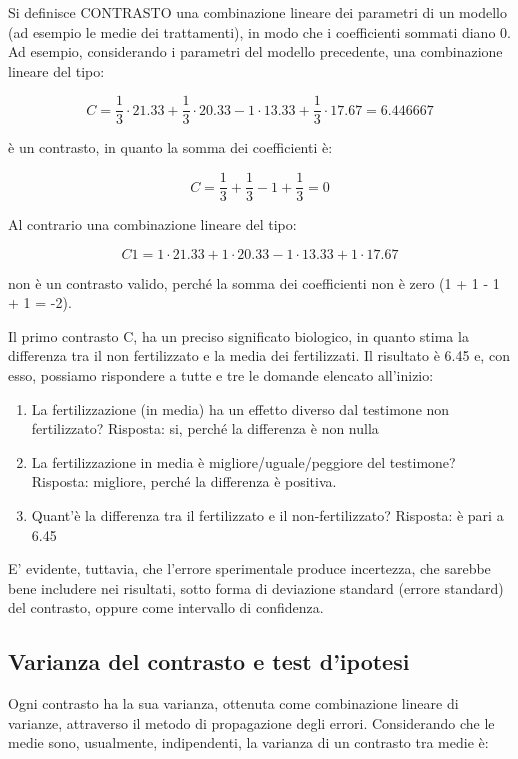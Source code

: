 \documentclass[a4paper,12pt,oneside]{book}
\providecommand{\tightlist}{%
  \setlength{\itemsep}{0pt}\setlength{\parskip}{0pt}}
\begin{document}
Si definisce CONTRASTO una combinazione lineare dei parametri di un modello (ad esempio le medie dei trattamenti), in modo che i coefficienti sommati diano 0. Ad esempio, considerando i parametri del modello precedente, una combinazione lineare del tipo:

\[C = \frac{1}{3} \cdot 21.33 + \frac{1}{3} \cdot 20.33 - 1 \cdot 13.33 + \frac{1}{3} \cdot 17.67 = 6.446667\]

è un contrasto, in quanto la somma dei coefficienti è:

\[C = \frac{1}{3} + \frac{1}{3} - 1 + \frac{1}{3} = 0\]

Al contrario una combinazione lineare del tipo:

\[C1 = 1 \cdot 21.33  + 1 \cdot 20.33 - 1 \cdot 13.33 + 1 \cdot 17.67\]

non è un contrasto valido, perché la somma dei coefficienti non è zero (1 + 1 - 1 + 1 = -2).

Il primo contrasto C, ha un preciso significato biologico, in quanto stima la differenza tra il non fertilizzato e la media dei fertilizzati. Il risultato è 6.45 e, con esso, possiamo rispondere a tutte e tre le domande elencato all'inizio:

\begin{enumerate}
\def\labelenumi{\arabic{enumi}.}
\tightlist
\item
  La fertilizzazione (in media) ha un effetto diverso dal testimone non fertilizzato? Risposta: si, perché la differenza è non nulla
\item
  La fertilizzazione in media è migliore/uguale/peggiore del testimone? Risposta: migliore, perché la differenza è positiva.
\item
  Quant'è la differenza tra il fertilizzato e il non-fertilizzato? Risposta: è pari a 6.45
\end{enumerate}

E' evidente, tuttavia, che l'errore sperimentale produce incertezza, che sarebbe bene includere nei risultati, sotto forma di deviazione standard (errore standard) del contrasto, oppure come intervallo di confidenza.

\hypertarget{varianza-del-contrasto-e-test-dipotesi}{%
\subsection{Varianza del contrasto e test d'ipotesi}\label{varianza-del-contrasto-e-test-dipotesi}}

Ogni contrasto ha la sua varianza, ottenuta come combinazione lineare di varianze, attraverso il metodo di propagazione degli errori. Considerando che le medie sono, usualmente, indipendenti, la varianza di un contrasto tra medie è:
\end{document}
